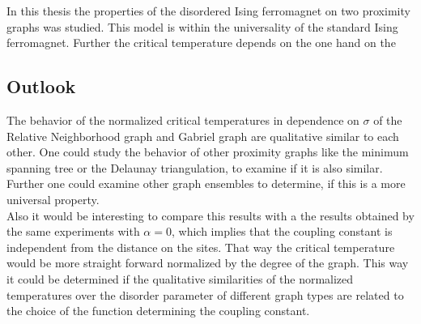 In this thesis the properties of the disordered Ising ferromagnet on two
proximity graphs was studied. This model is within the universality of
the standard Ising ferromagnet. Further the critical temperature depends
on the one hand on the

\subsection{Outlook}
    The behavior of the normalized critical temperatures in dependence
    on \(\sigma\) of the Relative Neighborhood graph and Gabriel graph
    are qualitative similar to each other. One could study the behavior
    of other proximity graphs like the minimum spanning tree or the
    Delaunay triangulation, to examine if it is also similar. Further
    one could examine other graph ensembles to determine, if this is a
    more universal property.\\
    Also it would be interesting to compare this results with a the
    results obtained by the same experiments with \(\alpha = 0\), which
    implies that the coupling constant is independent from the distance
    on the sites. That way the critical temperature would be more
    straight forward normalized by the degree of the graph. This way it
    could be determined if the qualitative similarities of the
    normalized temperatures over the disorder parameter of different
    graph types are related to the choice of the function determining the
    coupling constant.
